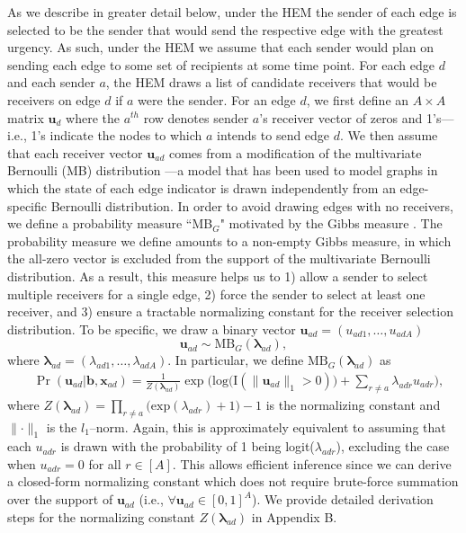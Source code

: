 \documentclass[ba]{imsart}
\numberwithin{equation}{section}
\theoremstyle{plain}
\begin{document}
	As we describe in greater detail below, under the HEM the sender of each edge is selected to be the sender that would send the respective edge with the greatest urgency. As such, under the HEM we assume that each sender would plan on sending each edge to some set of recipients at some time point. For each edge $d$ and each sender $a$, the HEM draws a list of candidate receivers that would be receivers on edge $d$ if $a$ were the sender. For an edge $d$, we first define an $A\times A$ matrix $\boldsymbol{u}_d$ where the $a^{th}$ row denotes sender $a$'s receiver vector of zeros and 1's---i.e., 1's indicate the nodes to which $a$ intends to send edge $d$. We then assume that each receiver vector $\boldsymbol{u}_{ad}$ comes from a modification of the multivariate Bernoulli (MB) distribution \citep{dai2013multivariate}---a model that has been used to model graphs in which the state of each edge indicator is drawn independently from an edge-specific Bernoulli distribution. In order to avoid drawing edges with no receivers, we define a probability measure ``MB$_{G}$" motivated by the Gibbs measure \citep{fellows2017removing}. The probability measure we define amounts to a non-empty Gibbs measure, in which the all-zero vector is excluded from the support of the multivariate Bernoulli distribution. As a result, this measure helps us to 1) allow a sender to select multiple receivers for a single edge, 2) force the sender to select at least one receiver, and 3) ensure a tractable normalizing constant for the receiver selection distribution. To be specific, we draw a binary vector $\boldsymbol{u}_{ad}= (u_{ad1},
	\ldots, u_{adA})$ 
	\begin{equation} \boldsymbol{u}_{ad}  \sim
		\mbox{MB}_{G}(\boldsymbol{\lambda}_{ad}),
	\end{equation}
	where $\boldsymbol{\lambda}_{ad}= (\lambda_{ad1},
	\ldots, \lambda_{adA})$. In particular, we define $\mbox{MB}_{G}(\boldsymbol{\lambda}_{ad})$ as
	\begin{equation}
		\begin{aligned}
			&\Pr(\boldsymbol{u}_{ad}|\boldsymbol{b}, \boldsymbol{x}_{ad}) = \frac{1}{Z(\boldsymbol{\lambda}_{ad})}\exp\Big(\mbox{log}\big(\text{I}( \lVert \boldsymbol{u}_{ad}\rVert_1 > 0 )\big) + \sum_{r\neq a} \lambda_{adr}u_{adr}\Big) ,
		\end{aligned}
		\label{eqn:Gibbs}
	\end{equation}
	where $Z(\boldsymbol{\lambda}_{ad})= \prod_{r \neq a} \big(\mbox{exp}(\lambda_{adr}) + 1\big)-1$ is the normalizing constant and $\lVert \cdot \rVert_1$ is the $l_1$--norm. Again, this is approximately equivalent to assuming that each $u_{adr}$ is drawn with the probability of 1 being logit($\lambda_{adr}$), excluding the case when $u_{adr}=0$ for all $r \in [A]$. This allows efficient inference since we can derive a closed-form normalizing constant which does not require brute-force summation over the support of $\boldsymbol{u}_{ad}$ (i.e., $\forall \boldsymbol{u}_{ad} \in [0,1]^A$). We provide detailed derivation steps for the normalizing constant $Z(\boldsymbol{\lambda}_{ad})$ in Appendix B. 
	
\end{document}
